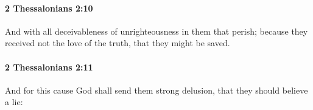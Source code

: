 		\paragraph{2 Thessalonians 2:10} %
			\label{2THESSALONIANS-2-10}

			And with all deceivableness of unrighteousness in them that perish; because they received not the love of the truth, that they might be saved.

			\begin{framed}
			\scriptsize
				\begin{compactdesc}
					\item[SBLG] 
				\end{compactdesc}
			\end{framed}

		\paragraph{2 Thessalonians 2:11} %
			\label{2THESSALONIANS-2-11}

			And for this cause God shall send them strong delusion, that they should believe a lie:

